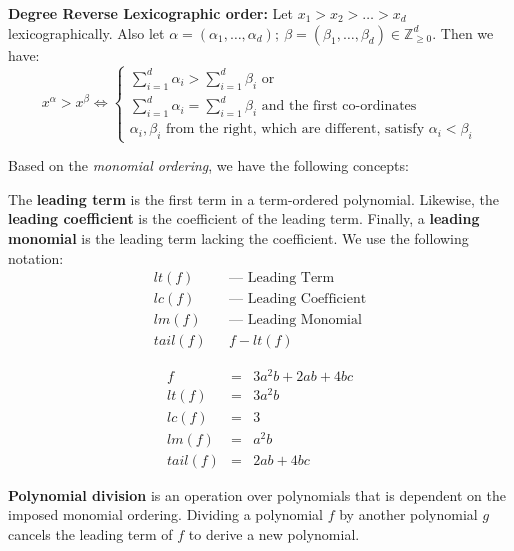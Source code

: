 \begin{Definition}
{\bf Degree Reverse Lexicographic order:} Let $x_1 > x_2 > \dots > x_d$
lexicographically. Also let $\alpha = (\alpha_1, \dots, \alpha_d);
~\beta = (\beta_1, \dots, \beta_d) \in \mathbb{Z}^d_{\geq 0}$. Then we
have: 
\begin{equation}
x^{\alpha} > x^{\beta} \iff 
\begin{cases}
\sum_{i=1}^{d}\alpha_i > \sum_{i=1}^{d} \beta_i  \text{ or }\\
\sum_{i=1}^{d}\alpha_i = \sum_{i=1}^{d} \beta_i  \text{ and the first co-ordinates}\\
\text{$\alpha_i, \beta_i$ from the right, which are different, satisfy $\alpha_i < \beta_i$}
\end{cases}
\end{equation}

\end{Definition}

Based on the {\it monomial ordering}, we have the following concepts:

\begin{Definition}
The {\bf leading term} is the first term in a term-ordered polynomial.
Likewise, the {\bf leading coefficient} is the coefficient of
the leading term. 
Finally, a {\bf leading monomial} is the leading term 
lacking the coefficient.  We use the following notation:
\begin{eqnarray}
     lt(f)&& \text{--- Leading Term} \\
     lc(f)&& \text{--- Leading Coefficient} \\
     lm(f)&& \text{--- Leading Monomial} \\
     tail(f)&& f - lt(f)
\end{eqnarray}
\end{Definition}

\begin{Example}
\begin{eqnarray}
     f      &=& 3a^2b + 2ab + 4bc \\
     lt(f)  &=& 3a^2b \\
     lc(f)  &=& 3 \\
     lm(f)  &=& a^2b \\
     tail(f) &=& 2ab+4bc
\end{eqnarray}
\end{Example}

{\bf Polynomial division} is an operation over polynomials that is dependent on
the imposed monomial ordering. Dividing a polynomial $f$ by another polynomial
$g$ cancels the leading term of $f$ to derive a new polynomial. 

